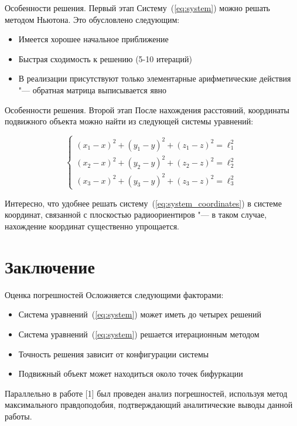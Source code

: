 \documentclass[russian,hyperref={unicode}]{beamer}
\begin{document}
  \begin{frame}{Особенности решения. Первый этап}
    Систему~(\ref{eq:system}) можно решать методом Ньютона. Это обусловлено следующим:
    \begin{itemize}
      \item Имеется хорошее начальное приближение
      \item Быстрая сходимость к решению (5-10 итераций)
      \item В реализации присутствуют только элементарные арифметические действия "--- обратная
            матрица выписывается явно
    \end{itemize}
  \end{frame}

  \begin{frame}{Особенности решения. Второй этап}
    После нахождения расстояний, координаты подвижного объекта можно найти из следующей
    системы уравнений:

    \begin{equation}\label{eq:system_coordinates}
      \begin{cases}
        \left(x_1 - x\right)^2 + \left(y_1 - y\right)^2 + \left(z_1 - z\right)^2 = \ell_1^2 \\
        \left(x_2 - x\right)^2 + \left(y_2 - y\right)^2 + \left(z_2 - z\right)^2 = \ell_2^2 \\
        \left(x_3 - x\right)^2 + \left(y_3 - y\right)^2 + \left(z_3 - z\right)^2 = \ell_3^2
      \end{cases}
    \end{equation}

    Интересно, что удобнее решать систему~(\ref{eq:system_coordinates}) в системе координат,
    связанной с плоскостью радиоориентиров "--- в таком случае, нахождение координат
    существенно упрощается.
  \end{frame}

  \section{Заключение}
  \begin{frame}{Оценка погрешностей}
    Осложняется следующими факторами:
    \begin{itemize}
      \item Система уравнений~(\ref{eq:system}) может иметь до четырех решений
      \item Система уравнений~(\ref{eq:system}) решается итерационным методом
      \item Точность решения зависит от конфигурации системы
      \item Подвижный объект может находиться около точек бифуркации
    \end{itemize}

    Параллельно в работе [1] был проведен анализ погрешностей, используя метод
    максимального правдоподобия, подтверждающий аналитические выводы данной работы.
  \end{frame}
\end{document}
